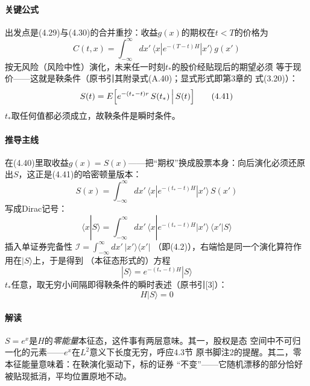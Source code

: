 \paragraph{关键公式}
出发点是(4.29)与(4.30)的合并重抄：收益$g(x)$的期权在$t<T$的价格为
\begin{equation*}
C(t,x)=\int_{-\infty}^{\infty}dx'\,
\langle x|e^{-(T-t)H}|x'\rangle\,g(x')
\tag{4.40}
\end{equation*}
按无风险（风险中性）演化，未来任一时刻$t_{*}$的股价经贴现后的期望必须
等于现价——这就是鞅条件（原书引其附录式(A.40)；显式形式即第3章的
式(3.20)）：
\begin{equation*}
S(t)=E\Bigl[e^{-(t_{*}-t)r}\,S(t_{*})\,\Big|\,S(t)\Bigr]
\tag{4.41}
\end{equation*}
$t_{*}$取任何值都必须成立，故鞅条件是瞬时条件。

\paragraph{推导主线}
在(4.40)里取收益$g(x)=S(x)$——把“期权”换成股票本身：向后演化必须还原
出$S$，这正是(4.41)的哈密顿量版本：
\begin{equation*}
S(x)=\int_{-\infty}^{\infty}dx'\,
\langle x|e^{-(t_{*}-t)H}|x'\rangle\,S(x')
\end{equation*}
写成Dirac记号：
\begin{equation*}
\langle x|S\rangle=\int_{-\infty}^{\infty}dx'\,
\langle x|e^{-(t_{*}-t)H}|x'\rangle\,\langle x'|S\rangle
\tag{4.42}
\end{equation*}
插入单证券完备性
$\mathcal{I}=\int_{-\infty}^{\infty}dx'\,|x'\rangle\langle x'|$
（即(4.2)），右端恰是同一个演化算符作用在$|S\rangle$上，于是得到
（本征态形式的）方程
\begin{equation*}
|S\rangle=e^{-(t_{*}-t)H}|S\rangle
\end{equation*}
$t_{*}$任意，取无穷小间隔即得鞅条件的瞬时表述（原书引[3]）：
\begin{equation*}
H|S\rangle=0
\tag{4.43}
\end{equation*}

\paragraph{解读}
$S=e^{x}$是$H$的\emph{零能量}本征态，这件事有两层意味。其一，股权是态
空间中不可归一化的元素——$e^{x}$在$L^{2}$意义下长度无穷，呼应4.3节
原书脚注2的提醒。其二，零本征能量意味着：在鞅演化驱动下，标的证券
“不变”——它随机漂移的部分恰好被贴现抵消，平均位置原地不动。

